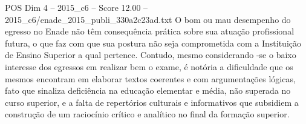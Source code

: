 \begin{textsample}{POS Dim 4 – 2015\_c6 – Score 12.00 – 2015\_c6/enade\_2015\_publi\_330a2c23ad.txt}
O bom ou mau desempenho do egresso no Enade não têm consequência prática sobre sua atuação profissional futura, o que faz com que sua postura não seja comprometida com a Instituição de Ensino Superior a qual pertence.
Contudo, mesmo considerando -se o baixo interesse dos egressos em realizar bem o exame, é notória a dificuldade que os mesmos encontram em elaborar textos coerentes e com argumentações lógicas, fato que sinaliza deficiência na educação elementar e média, não superada no curso superior, e a falta de repertórios culturais e informativos que subsidiem a construção de um raciocínio crítico e analítico no final da formação superior.

\end{textsample}
